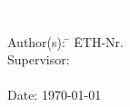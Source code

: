 %
%
%
%


\begin{titlepage}


{
\vspace{5mm}
{\Huge\textcolor{white}{Bachelor Arbeit}}\\[2mm]
{\Huge\textcolor{white}{\textbf{\mytitle}}}

{\color{white} 
\begin{tabbing}
Author(s): \hspace{20mm} \= \myauthor \hspace{20mm} \= ETH-Nr. \myethnr \\[3mm]
Supervisor: \> \myprofessor\\[1mm]
\> \mysupervisor\\[3mm]
Date: \> \today
\end{tabbing}
}
}
\vspace{7mm}
\begin{figure}[h!]
  \centering
  
\end{figure}




\end{titlepage}


%

